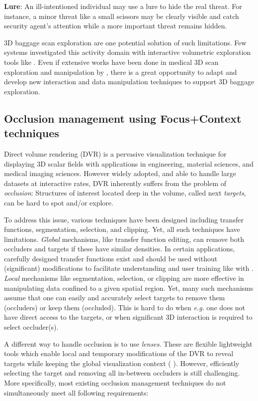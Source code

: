 \textbf{Lure}: An ill-intentioned individual may use a lure to hide the real threat. For instance, a minor threat like a small scissors may be clearly visible and catch security agent's attention while a more important threat remains hidden.


3D baggage scan exploration are one potential solution of such limitations. Few systems investigated this activity domain with interactive volumetric exploration tools like \cite{Li:2012:LVV:2425296.2425325}. Even if extensive works have been done in medical 3D scan exploration and manipulation by \cite{preim2013visual}, there is a great opportunity to adapt and develop new interaction and data manipulation techniques to support 3D baggage exploration.
 
 
 \subsection{Occlusion management using Focus+Context techniques}
 \label{introreq}
 
 Direct volume rendering (DVR) is a pervasive visualization technique for displaying 3D scalar fields with applications in engineering, material sciences, and medical imaging sciences. However widely adopted, and able to handle large datasets at interactive rates, DVR inherently suffers from the problem of \emph{occlusion}: Structures of interest located deep in the volume, called next \emph{targets}, can be hard to spot and/or explore.


To address this issue, various techniques have been designed including transfer functions, segmentation, selection, and clipping. Yet, all such techniques have limitations.  \emph{Global} mechanisms, like transfer function editing, can remove both occluders and targets if these have similar densities. In certain applications, carefully designed transfer functions exist and should be used without (significant) modifications to facilitate understanding and user training like with \cite{4276082}. \emph{Local} mechanisms like segmentation, selection, or clipping are more effective in manipulating data confined to a given spatial region. Yet, many such mechanisms assume that one can easily and accurately select targets to remove them (occluders) or keep them (occluded). This is hard to do when \emph{e.g.} one does not have direct access to the targets, or when significant 3D interaction is required to select occluder(s).


A different way to handle occlusion is to use \emph{lenses}. These are flexible lightweight tools which enable local and temporary modifications of the DVR to reveal targets while keeping the global visualization context ( \cite{595268,CGF:CGF12871,6327262} ). However, efficiently selecting the target and  removing all in-between occluders is still challenging. More specifically, most existing occlusion management techniques do not simultaneously meet all following requirements: 


